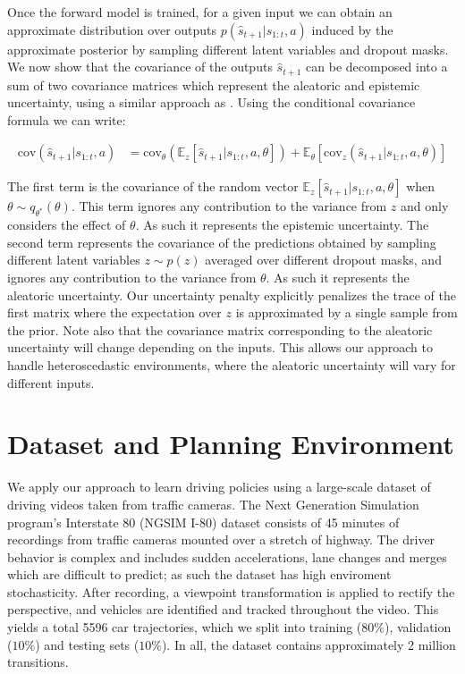 \documentclass{article} %
\begin{document}
Once the forward model is trained, for a given input we can obtain an approximate distribution over outputs $p(\hat{s}_{t+1} | s_{1:t}, a)$ induced by the approximate posterior by sampling different latent variables and dropout masks.
We now show that the covariance of the outputs $\hat{s}_{t+1}$ can be decomposed into a sum of two covariance matrices which represent the aleatoric and epistemic uncertainty, using a similar approach as \citep{depeweg18}. 
Using the conditional covariance formula we can write:

\begin{align}
  \mbox{cov}(\hat{s}_{t+1} | s_{1:t}, a) &= \mbox{cov}_\theta(\mathbb{E}_z[\hat{s}_{t+1} | s_{1:t}, a, \theta]) + \mathbb{E}_\theta[\mbox{cov}_z(\hat{s}_{t+1} | s_{1:t}, a, \theta)]
\end{align}

The first term is the covariance of the random vector $\mathbb{E}_z[\hat{s}_{t+1} | s_{1:t}, a, \theta]$ when $\theta \sim q_{\theta^*}(\theta)$.
This term ignores any contribution to the variance from $z$ and only considers the effect of $\theta$. As such it represents the epistemic uncertainty.
The second term represents the covariance of the predictions obtained by sampling different latent variables $z \sim p(z)$ averaged over different dropout masks, and ignores any contribution to the variance from $\theta$. As such it represents the aleatoric uncertainty.
Our uncertainty penalty explicitly penalizes the trace of the first matrix where the expectation over $z$ is approximated by a single sample from the prior.
Note also that the covariance matrix corresponding to the aleatoric uncertainty will change depending on the inputs. This allows our approach to handle heteroscedastic environments, where the aleatoric uncertainty will vary for different inputs.




\section{Dataset and Planning Environment}
\label{dataset-and-planning}

We apply our approach to learn driving policies using a large-scale dataset of driving videos taken from traffic cameras.
The Next Generation Simulation program's Interstate 80 (NGSIM I-80) dataset \citep{NGSIM} consists of 45 minutes of recordings from traffic cameras mounted over a stretch of highway.
The driver behavior is complex and includes sudden accelerations, lane changes and merges which are difficult to predict; as such the dataset has high enviroment stochasticity.
After recording, a viewpoint transformation is applied to rectify the perspective, and vehicles are identified and tracked throughout the video.
This yields a total 5596 car trajectories, which we split into training ($80\%$), validation ($10\%$) and testing sets ($10\%$). In all, the dataset contains approximately 2 million transitions. 
\end{document}
